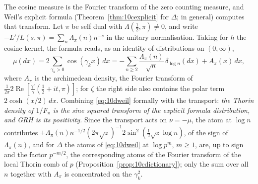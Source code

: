 The cosine measure is the Fourier transform of the zero counting measure, and Weil's explicit formula (Theorem~\ref{thm:10cexplicit} for $\Delta$; \cite{weil1952,iwanieckowalski2004} in general) computes that transform. Let $\pi$ be self dual with $\Lambda(\frac12,\pi)\ne0$, and write $-L'/L(s,\pi) = \sum_n\Lambda_\pi(n)n^{-s}$ in the unitary normalisation. Taking for $h$ the cosine kernel, the formula reads, as an identity of distributions on $(0,\infty)$,
\begin{equation}\label{eq:10dweil}
\mu(dx) = 2\sum_{\gamma_k>0}\cos(\gamma_kx)\,dx = -\sum_{n\ge2}\frac{\Lambda_\pi(n)}{\sqrt n}\,\delta_{\log n}(dx)+A_\pi(x)\,dx,
\end{equation}
where $A_\pi$ is the archimedean density, the Fourier transform of $\frac1{2\pi}2\operatorname{Re}[\frac{\gamma'}{\gamma}(\frac12+it,\pi)]$; for $\zeta$ the right side also contains the polar term $2\cosh(x/2)\,dx$. Combining \eqref{eq:10dweil} formally with the transport: \emph{the Thorin density of $1/F_\pi$ is the sine squared transform of the explicit formula distribution, and GRH is its positivity.} Since the transport acts on $\nu = -\mu$, the atom at $\log n$ contributes $+\Lambda_\pi(n)n^{-1/2}(2\pi\sqrt z)^{-1}2\sin^2(\frac12\sqrt z\log n)$, of the sign of $\Lambda_\pi(n)$, and for $\Delta$ the atoms of \eqref{eq:10dweil} at $\log p^m$, $m\ge1$, are, up to sign and the factor $p^{-m/2}$, the corresponding atoms of the Fourier transform of the local Thorin comb of $p$ (Proposition~\ref{prop:10cdictionary}); only the sum over all $n$ together with $A_\pi$ is concentrated on the $\gamma_k^2$.

